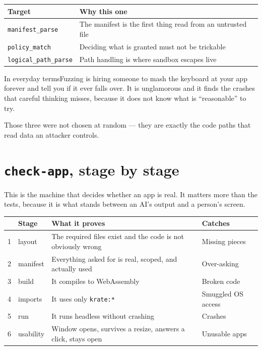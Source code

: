 \documentclass[11pt,a4paper]{report}
\newcommand{\analogy}[1]{\begin{plainbox}{In everyday terms}#1\end{plainbox}}
\begin{document}
\begin{center}
\begin{tabular}{lp{7.6cm}}
\toprule
\textbf{Target} & \textbf{Why this one} \\
\midrule
\texttt{manifest\_parse} & The manifest is the first thing read from an
  untrusted file \\
\texttt{policy\_match} & Deciding what is granted must not be trickable \\
\texttt{logical\_path\_parse} & Path handling is where sandbox escapes live \\
\bottomrule
\end{tabular}
\end{center}

\analogy{Fuzzing is hiring someone to mash the keyboard at your app forever
and tell you if it ever falls over. It is unglamorous and it finds the
crashes that careful thinking misses, because it does not know what is
``reasonable'' to try.}

Those three were not chosen at random --- they are exactly the code paths
that read data an attacker controls.

\section{\texttt{check-app}, stage by stage}

This is the machine that decides whether an app is real. It matters more
than the tests, because it is what stands between an AI's output and a
person's screen.

\begin{center}
\begin{longtable}{clp{5.9cm}p{2.8cm}}
\toprule
& \textbf{Stage} & \textbf{What it proves} & \textbf{Catches} \\
\midrule
\endhead
1 & layout & The required files exist and the code is not obviously wrong & Missing pieces \\
2 & manifest & Everything asked for is real, scoped, and actually used & Over-asking \\
3 & build & It compiles to WebAssembly & Broken code \\
4 & imports & It uses only \texttt{krate:*} & Smuggled OS access \\
5 & run & It runs headless without crashing & Crashes \\
6 & usability & Window opens, survives a resize, answers a click, stays open & Unusable apps \\
\bottomrule
\end{longtable}
\end{center}
\end{document}
